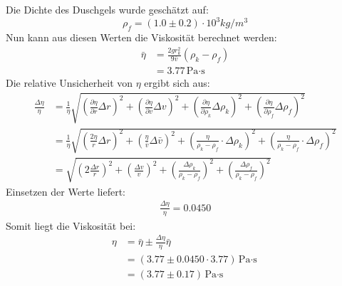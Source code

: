 \documentclass{report}
\begin{document}
Die Dichte des Duschgels wurde geschätzt auf:
\begin{equation}
    \rho_f = (1.0 \pm 0.2) \cdot 10^3 kg/m^3
\end{equation}
Nun kann aus diesen Werten die Viskosität berechnet werden:
\begin{equation}
    \begin{split}
        \bar{\eta} &= \frac{2gr_k^2}{9\bar{v}}\left(\rho_k - \rho_f\right) \\
                   &= 3.77 \si{\Pa \cdot \s}
    \end{split}
\end{equation}
Die relative Unsicherheit von $\eta$ ergibt sich aus:
\begin{equation}
    \begin{split}
        \frac{\Delta \eta}{\eta} &= \frac{1}{\eta} \sqrt{  \left(\frac{\partial \eta}{\partial r} \Delta r\right)^2
                                                        + \left(\frac{\partial \eta}{\partial v} \Delta v\right)^2
                                                        + \left(\frac{\partial \eta}{\partial \rho_k} \Delta \rho_k \right)^2
                                                        + \left(\frac{\partial \eta}{\partial \rho_f} \Delta \rho_f \right)^2} \\
                                 &= \frac{1}{\eta} \sqrt{\left(\frac{2\eta}{r} \Delta r\right)^2
                                                        + \left(\frac{\eta}{\bar{v}} \Delta \bar{v}\right)^2
                                                        + \left(\frac{\eta}{\rho_k - \rho_f} \cdot \Delta \rho_k\right)^2
                                                        + \left(\frac{\eta}{\rho_k - \rho_f} \cdot \Delta \rho_f\right)^2} \\
                                 &= \sqrt{\left(2\frac{\Delta r}{r}\right)^2 
                                                        + \left(\frac{\Delta v}{v}\right)^2 
                                                        + \left(\frac{\Delta \rho_k}{\rho_k - \rho_f}\right)^2
                                                        + \left(\frac{\Delta \rho_f}{\rho_k - \rho_f}\right)^2}
    \end{split}
\end{equation}
Einsetzen der Werte liefert:
\begin{eqnarray}
    \frac{\Delta \eta}{\eta} = 0.0450
\end{eqnarray}
Somit liegt die Viskosität bei:
\begin{equation}
    \begin{split}
        \eta &= \bar{\eta} \pm \frac{\Delta \eta}{\eta} \bar{\eta}\\
             &= (3.77 \pm 0.0450 \cdot 3.77) \si{\Pa \cdot \s} \\
             &= (3.77 \pm 0.17)\si{\Pa \cdot \s}
    \end{split}
\end{equation}
\end{document}
